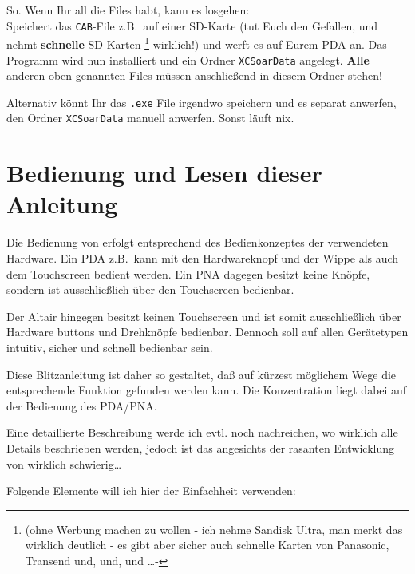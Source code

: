 So. Wenn Ihr all die Files habt, kann es losgehen:\\[1em]

Speichert das \texttt{CAB}-File z.B.\ auf einer SD-Karte (tut Euch den Gefallen, und nehmt \textbf{schnelle} SD-Karten \footnote{(ohne Werbung machen zu wollen - ich nehme Sandisk Ultra, man merkt das wirklich deutlich - es gibt aber sicher auch schnelle Karten von Panasonic, Transend  und, und, und \dots - } wirklich!) und werft es \merkes auf Eurem \textsf{PDA} an. Das Programm wird  nun installiert und ein Ordner \texttt{XCSoarData} angelegt. \textbf{Alle} anderen oben genannten Files müssen anschließend in diesem Ordner stehen!

Alternativ könnt Ihr das \texttt{.exe} File irgendwo speichern und es separat anwerfen,
den Ordner \texttt{XCSoarData} manuell anwerfen. Sonst läuft nix.
%
\section{Bedienung und Lesen dieser Anleitung}
Die Bedienung von \xc erfolgt entsprechend des Bedienkonzeptes der verwendeten Hardware.
Ein \textsf{PDA} z.B.\ kann mit den Hardwareknopf und der Wippe als auch dem Touchscreen
bedient werden. Ein \textsf{PNA} dagegen besitzt keine Knöpfe, sondern ist ausschließlich über den Touchscreen bedienbar.

Der \textsf{Altair} hingegen besitzt keinen Touchscreen und ist somit ausschließlich über Hardware buttons und Drehknöpfe bedienbar. Dennoch soll \xc auf allen Gerätetypen intuitiv, sicher und schnell bedienbar sein.

Diese Blitzanleitung ist daher so gestaltet, daß auf kürzest möglichem Wege die entsprechende Funktion gefunden werden kann. Die Konzentration liegt dabei auf der Bedienung des \textsf{PDA/PNA}.

Eine detaillierte Beschreibung werde ich evtl. noch nachreichen, wo wirklich alle Details beschrieben werden, jedoch ist das angesichts der rasanten Entwicklung von \xc wirklich schwierig\dots

Folgende Elemente will ich hier der Einfachheit verwenden:

